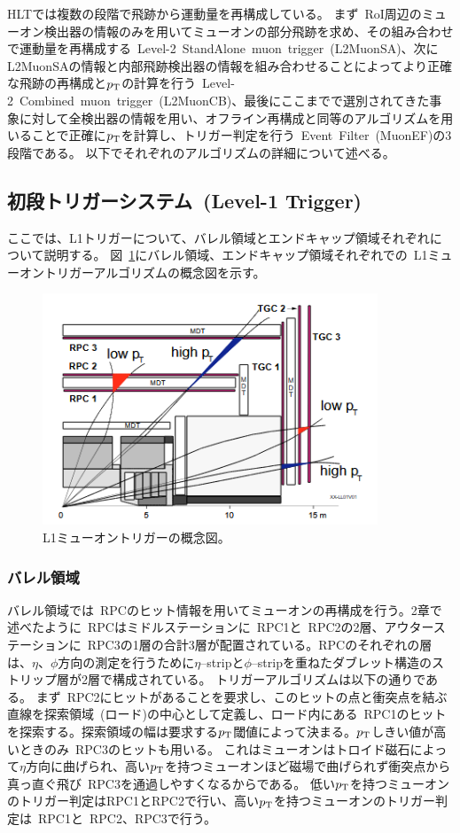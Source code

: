 HLTでは複数の段階で飛跡から運動量を再構成している。
まず~RoI周辺のミューオン検出器の情報のみを用いてミューオンの部分飛跡を求め、その組み合わせで運動量を再構成する~Level-2~StandAlone~muon~trigger~(L2MuonSA)、次にL2MuonSAの情報と内部飛跡検出器の情報を組み合わせることによってより正確な飛跡の再構成と$p_\mathrm{T}$の計算を行う~Level-2~Combined~muon~trigger~(L2MuonCB)、最後にここまでで選別されてきた事象に対して全検出器の情報を用い、オフライン再構成と同等のアルゴリズムを用いることで正確に$p_\mathrm{T}$を計算し、トリガー判定を行う~Event~Filter~(MuonEF)の3段階である。
以下でそれぞれのアルゴリズムの詳細について述べる。

\subsection{初段トリガーシステム~(Level-1 Trigger)}\label{chapter3-2-1}
ここでは、L1トリガーについて、バレル領域とエンドキャップ領域それぞれについて説明する。
図~\ref{fig:3-2}にバレル領域、エンドキャップ領域それぞれでの~L1ミューオントリガーアルゴリズムの概念図を示す。

\begin{figure}[h]
  \centering
  \includegraphics[clip, width=10cm]{fig/3/muon_trigger_overview.png}
  \caption{L1ミューオントリガーの概念図\cite{article:barrelSystem}。}
  \label{fig:3-2}
\end{figure}

\subsubsection{バレル領域}
バレル領域では~RPCのヒット情報を用いてミューオンの再構成を行う。2章で述べたように~RPCはミドルステーションに~RPC1と~RPC2の2層、アウターステーションに~RPC3の1層の合計3層が配置されている。RPCのそれぞれの層は、$\eta$、$\phi$方向の測定を行うために$\eta$--stripと$\phi$--stripを重ねたダブレット構造のストリップ層が2層で構成されている。
トリガーアルゴリズムは以下の通りである。
まず~RPC2にヒットがあることを要求し、このヒットの点と衝突点を結ぶ直線を探索領域~(ロード)の中心として定義し、ロード内にある~RPC1のヒットを探索する。探索領域の幅は要求する$p_\mathrm{T}$閾値によって決まる。$p_\mathrm{T}$しきい値が高いときのみ~RPC3のヒットも用いる。
これはミューオンはトロイド磁石によって$\eta$方向に曲げられ、高い$p_\mathrm{T}$を持つミューオンほど磁場で曲げられず衝突点から真っ直ぐ飛び~RPC3を通過しやすくなるからである。
低い$p_\mathrm{T}$を持つミューオンのトリガー判定はRPC1とRPC2で行い、高い$p_\mathrm{T}$を持つミューオンのトリガー判定は~RPC1と~RPC2、RPC3で行う。

